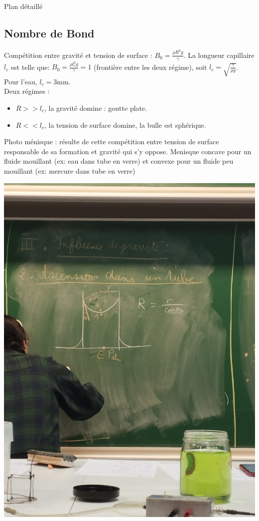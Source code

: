 \begin{reportBlock}{Plan détaillé}
  \subsection{Nombre de Bond}
  Compétition entre gravité et tension de surface : $B_0=\frac{\rho R^2g}{\gamma}$. La longueur capillaire $l_c$ est telle que: $B_0=\frac{\rho l_c^2g}{\gamma}=1$ (frontière entre les deux régime), soit $l_c = \sqrt{\frac{\gamma}{\rho g}}$.
  Pour l'eau, $l_c=3$mm.\\
  Deux régimes : 
  \begin{itemize}
      \item $R>>l_c$, la gravité domine : goutte plate.
      \item $R<<l_c$, la tension de surface domine, la bulle est sphérique.
  \end{itemize}
  Photo ménisque : résulte de cette compétition entre tension de surface responsable de sa formation et gravité qui s'y oppose. Menisque concave pour un fluide mouillant (ex: eau dans tube en verre) et convexe pour un fluide peu mouillant (ex: mercure dans tube en verre)
  \begin{center}
      \includegraphics[scale=0.1]{LP_TensionSurface/Menisque.jpg}
  \end{center}


\end{reportBlock}
